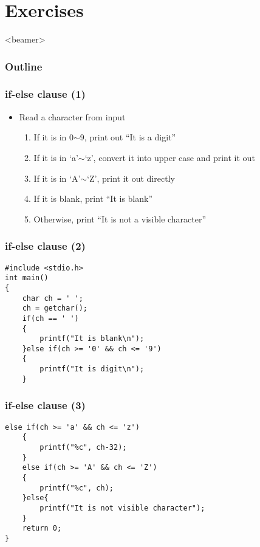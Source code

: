 \section{Exercises}
\begin{frame}<beamer>
    \frametitle{Outline}
    \tableofcontents[currentsection]
\end{frame}
\label{sec:exec}

\begin{frame}\frametitle{if-else clause (1)}
\begin{itemize}
	\item {Read a character from input}
	\begin{enumerate}
		\item {If it is in 0$\sim$9, print out ``It is a digit''}
		\item {If it is in `a'$\sim$`z', convert it into upper case and print it out}
		\item {If it is in `A'$\sim$`Z', print it out directly}
		\item {If it is blank, print ``It is blank''}
		\item {Otherwise, print ``It is not a visible character''}
	\end{enumerate}
\end{itemize}
\end{frame}

\ifx\answer{}
\begin{frame}[fragile]\frametitle{if-else clause (2)}
	\begin{lstlisting}[basicstyle=\large]
#include <stdio.h>
int main()
{
    char ch = ' ';
    ch = getchar();
    if(ch == ' ')
    {
        printf("It is blank\n");
    }else if(ch >= '0' && ch <= '9')
    {
        printf("It is digit\n");
    }
	\end{lstlisting}
\end{frame}

\begin{frame}[fragile]\frametitle{if-else clause (3)}
	\begin{lstlisting}[basicstyle=\large,firstnumber=12]
    else if(ch >= 'a' && ch <= 'z')
    {
        printf("%c", ch-32);
    }    
    else if(ch >= 'A' && ch <= 'Z')
    {
        printf("%c", ch);
    }else{
        printf("It is not visible character");
    }
    return 0;
}
	\end{lstlisting}
\end{frame}
\fi

